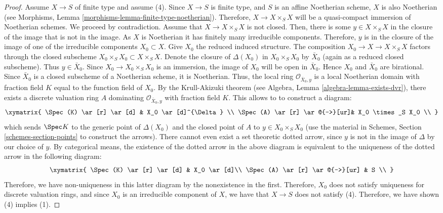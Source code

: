 \begin{proof}
\medskip\noindent
Assume $X \to S$ of finite type and assume (4).
Since $X \to S$ is finite type, and $S$ is an affine Noetherian
scheme, $X$ is also Noetherian (see
Morphisms, Lemma \ref{morphisms-lemma-finite-type-noetherian}).
Therefore, $X \to X \times_S X$ will
be a quasi-compact immersion of Noetherian schemes.  We proceed by
contradiction.  Assume that $X \to X \times_S X$ is not closed.  Then,
there is some $y \in X \times_S X$ in the closure of the image that is
not in the image. As $X$ is Noetherian it has finitely many irreducible
components. Therefore, $y$ is in the closure of the image of one of
the irreducible components $X_0 \subset X$.  Give $X_0$ the reduced
induced structure.  The composition $X_0 \to X \to X \times_S X$
factors through the closed subscheme $X_0 \times_S X_0 \subset X \times_S X$.
Denote the closure of $\Delta(X_0)$ in $X_0 \times_S X_0$
by $\bar X_0$ (again as a reduced closed subscheme). Thus $y \in \bar X_0$.
Since $X_0 \to X_0 \times_S X_0$ is an immersion, the image of $X_0$
will be open in $\bar X_0$. Hence $X_0$ and $\bar X_0$ are
birational. Since $\bar{X}_0$ is a closed subscheme of a
Noetherian scheme, it is Noetherian. Thus, the local ring
$\mathcal O_{{\bar X_0, y}}$ is a local Noetherian domain with fraction
field $K$ equal to the function field of $X_0$.  By the Krull-Akizuki
theorem (see Algebra, Lemma \ref{algebra-lemma-exists-dvr}), there exists a
discrete valuation ring $A$ dominating $\mathcal O_{{\bar X_0, y}}$
with fraction field $K$.  This allows to to construct a diagram:
\begin{equation}
\label{equation-valuative-generic}
\xymatrix{
\Spec(K) \ar[r] \ar[d] & X_0 \ar[d]^{\Delta} \\
\Spec(A) \ar[r] \ar@{-->}[ur]& X_0 \times_S X_0 \\
}
\end{equation}
which sends $\Spec K$ to the generic point of $\Delta(X_0)$ and
the closed point of $A$ to $y \in X_0 \times_S X_0$ (use the material in
Schemes, Section \ref{schemes-section-points} to construct the arrows).
There cannot even exist
a set theoretic dotted arrow, since $y$ is not in the image of
$\Delta$ by our choice of $y$.  By categorical means, the existence of
the dotted arrow in the above diagram is equivalent to the uniqueness
of the dotted arrow in the following diagram:
\begin{equation}
\label{equation-valuative-nonexistent}
\xymatrix{
\Spec(K) \ar[r] \ar[d] & X_0 \ar[d]\\
\Spec(A) \ar[r] \ar@{-->}[ur] & S \\
}
\end{equation}
Therefore, we have non-uniqueness in this latter diagram by the
nonexistence in the first.  Therefore, $X_0$ does not satisfy
uniqueness for discrete valuation rings, and since $X_0$ is an
irreducible component of $X$, we have that $X \to S$ does not satisfy
(4).  Therefore, we have shown (4) implies (1).
\end{proof}

